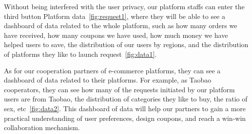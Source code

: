 Without being interfered with the user privacy, our platform staffs can enter the third button Platform data~\ref{fig:request1}, where they will be able to see a dashboard of data related to the whole platform, such as how many orders we have received, how many coupons we have used, how much money we have helped users to save, the distribution of our users by regions, and the distribution of platforms they like to launch request~\ref{fig:data1}.

As for our cooperation partners of e-commerce platforms, they can see a dashboard of data related to their platforms. For example, as Taobao cooperators, they can see how many of the requests initiated by our platform users are from Taobao, the distribution of categories they like to buy, the ratio of sex, etc~\ref{fig:data2}. This dashboard of data will help our partners to gain a more practical understanding of user preferences, design coupons, and reach a win-win collaboration mechanism.
